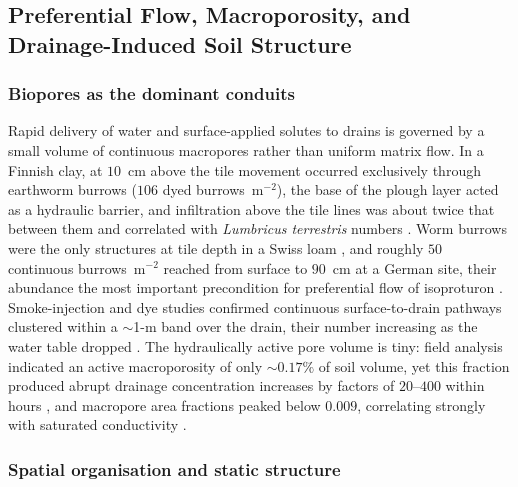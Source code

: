 \documentclass[11pt]{article}
\begin{document}
\subsection{Preferential Flow, Macroporosity, and Drainage-Induced Soil Structure}

\subsubsection{Biopores as the dominant conduits}

Rapid delivery of water and surface-applied solutes to drains is governed by
a small volume of continuous macropores rather than uniform matrix flow. In a
Finnish clay, at $10$~cm above the tile movement occurred exclusively through
earthworm burrows ($106$ dyed burrows~m$^{-2}$), the base of the plough layer
acted as a hydraulic barrier, and infiltration above the tile lines was about
twice that between them and correlated with \textit{Lumbricus terrestris}
numbers \parencite{Shipitalo2004}. Worm burrows were the only structures at
tile depth in a Swiss loam \parencite{Stamm2002}, and roughly $50$ continuous
burrows~m$^{-2}$ reached from surface to $90$~cm at a German site, their
abundance the most important precondition for preferential flow of isoproturon
\parencite{Zehe2001}. Smoke-injection and dye studies confirmed continuous
surface-to-drain pathways clustered within a $\sim$1-m band over the drain,
their number increasing as the water table dropped
\parencite{Nielsen2015,Petersen2012}. The hydraulically active pore volume is
tiny: field analysis indicated an active macroporosity of only $\sim0.17\%$ of
soil volume, yet this fraction produced abrupt drainage concentration
increases by factors of $20$--$400$ within hours \parencite{Villholth1998},
and macropore area fractions peaked below $0.009$, correlating strongly with
saturated conductivity \parencite{Frey2011}.

\subsubsection{Spatial organisation and static structure}
\end{document}
